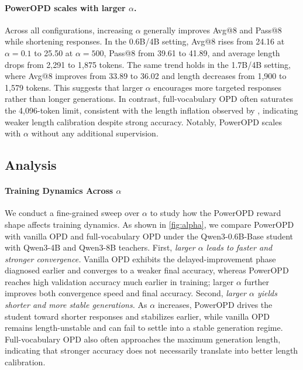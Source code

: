 \paragraph{PowerOPD scales with larger \(\alpha\).}
Across all configurations, increasing \(\alpha\) generally improves Avg@8 and Pass@8 while shortening responses. In the 0.6B/4B setting, Avg@8 rises from 24.16 at \(\alpha{=}0.1\) to 25.50 at \(\alpha{=}500\), Pass@8 from 39.61 to 41.89, and average length drops from 2{,}291 to 1{,}875 tokens. The same trend holds in the 1.7B/4B setting, where Avg@8 improves from 33.89 to 36.02 and length decreases from 1{,}900 to 1{,}579 tokens. This suggests that larger \(\alpha\) encourages more targeted responses rather than longer generations. In contrast, full-vocabulary OPD often saturates the 4,096-token limit, consistent with the length inflation observed by \citet{luo2026demystifying}, 
indicating weaker length calibration despite strong accuracy. Notably, PowerOPD scales with \(\alpha\) without any additional supervision.



\subsection{Analysis}
\paragraph{Training Dynamics Across \texorpdfstring{\(\alpha\)}{alpha}}
\label{subsec:alpha-training-dynamics}

We conduct a fine-grained sweep over \(\alpha\) to study how the PowerOPD reward shape affects training dynamics. As shown in \autoref{fig:alpha}, we compare PowerOPD with vanilla OPD and full-vocabulary OPD under the Qwen3-0.6B-Base student with Qwen3-4B and Qwen3-8B teachers. First, \emph{larger \(\alpha\) leads to faster and stronger convergence.} Vanilla OPD exhibits the delayed-improvement phase diagnosed earlier and converges to a weaker final accuracy, whereas PowerOPD reaches high validation accuracy much earlier in training; larger \(\alpha\) further improves both convergence speed and final accuracy. Second, \emph{larger \(\alpha\) yields shorter and more stable generations.} As \(\alpha\) increases, PowerOPD drives the student toward shorter responses and stabilizes earlier, while vanilla OPD remains length-unstable and can fail to settle into a stable generation regime. Full-vocabulary OPD also often approaches the maximum generation length, indicating that stronger accuracy does not necessarily translate into better length calibration.

